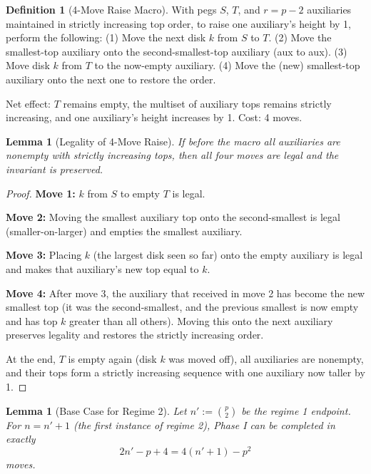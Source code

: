 \documentclass[11pt]{article}
\newtheorem{lemma}[theorem]{Lemma}
\theoremstyle{definition}
\newtheorem{definition}{Definition}
\begin{document}
\begin{definition}[4-Move Raise Macro]
With pegs $S$, $T$, and $r = p-2$ auxiliaries maintained in strictly increasing top order, to raise one auxiliary's height by 1, perform the following: (1) Move the next disk $k$ from $S$ to $T$. (2) Move the smallest-top auxiliary onto the second-smallest-top auxiliary (aux to aux). (3) Move disk $k$ from $T$ to the now-empty auxiliary. (4) Move the (new) smallest-top auxiliary onto the next one to restore the order.

Net effect: $T$ remains empty, the multiset of auxiliary tops remains strictly increasing, and one auxiliary's height increases by 1. Cost: 4 moves.
\end{definition}

\begin{lemma}[Legality of 4-Move Raise]\label{lem:4move-legal}
If before the macro all auxiliaries are nonempty with strictly increasing tops, then all four moves are legal and the invariant is preserved.
\end{lemma}

\begin{proof}
\textbf{Move 1:} $k$ from $S$ to empty $T$ is legal.

\textbf{Move 2:} Moving the smallest auxiliary top onto the second-smallest is legal (smaller-on-larger) and empties the smallest auxiliary.

\textbf{Move 3:} Placing $k$ (the largest disk seen so far) onto the empty auxiliary is legal and makes that auxiliary's new top equal to $k$.

\textbf{Move 4:} After move 3, the auxiliary that received in move 2 has become the new smallest top (it was the second-smallest, and the previous smallest is now empty and has top $k$ greater than all others). Moving this onto the next auxiliary preserves legality and restores the strictly increasing order.

At the end, $T$ is empty again (disk $k$ was moved off), all auxiliaries are nonempty, and their tops form a strictly increasing sequence with one auxiliary now taller by 1.
\end{proof}

\begin{lemma}[Base Case for Regime 2]\label{lem:regime2-base}
Let $n' := \binom{p}{2}$ be the regime 1 endpoint. For $n = n' + 1$ (the first instance of regime 2), Phase I can be completed in exactly
\[
2n' - p + 4 = 4(n'+1) - p^2
\]
moves.
\end{lemma}
\end{document}
